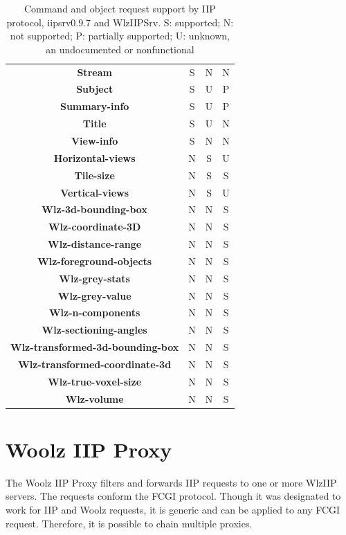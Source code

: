 \documentclass[11pt]{article}
\newcommand{\com}[1]{\textbf{#1}}
\begin{document}
\begin{table}[!hp]
{\begin{tabular}{|c|c|c|c|}
\com{Stream}            & S & N & N \\
\com{Subject}           & S & U & P \\
\com{Summary-info}      & S & U & P \\
\com{Title}             & S & U & N \\
\com{View-info}         & S & N & N \\
\hline
\com{Horizontal-views}      & N & S & U \\
\com{Tile-size}             & N & S & S \\
\com{Vertical-views}        & N & S & U \\
\hline
\com{Wlz-3d-bounding-box}   & N & N & S \\
\com{Wlz-coordinate-3D}     & N & N & S \\
\com{Wlz-distance-range}    & N & N & S \\
\com{Wlz-foreground-objects}& N & N & S \\
\com{Wlz-grey-stats}        & N & N & S \\
\com{Wlz-grey-value}        & N & N & S \\
\com{Wlz-n-components}      & N & N & S \\
\com{Wlz-sectioning-angles} & N & N & S \\
\com{Wlz-transformed-3d-bounding-box}   & N & N & S \\
\com{Wlz-transformed-coordinate-3d}        & N & N & S \\
\com{Wlz-true-voxel-size}   & N & N & S \\
\com{Wlz-volume}            & N & N & S \\
\hline
\end{tabular}
}
\caption{Command and object request support by IIP protocol,
         iipsrv0.9.7 and WlzIIPSrv. S: supported; N: not supported;
	 P: partially supported; U: unknown, an undocumented or
	 nonfunctional}
\label{tab:comparision}
\end{table}

\section{Woolz IIP Proxy}

The Woolz IIP Proxy filters and forwards IIP requests to one or more
WlzIIP servers. The requests conform the FCGI protocol. Though it was
designated to work for IIP and Woolz requests, it is generic and can
be applied to any FCGI request. Therefore, it is possible to chain
multiple proxies.
\end{document}
